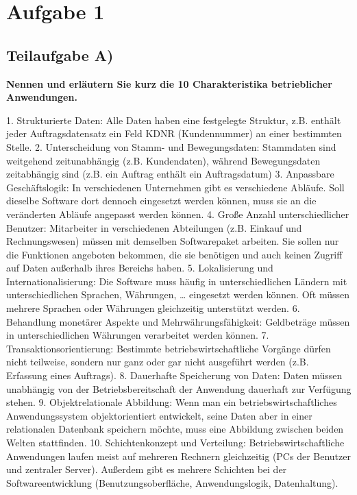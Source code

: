 \section{Aufgabe 1}

\subsection{Teilaufgabe A)}
\textbf{Nennen und erläutern Sie kurz die 10 Charakteristika betrieblicher
Anwendungen.}

1. Strukturierte Daten: Alle Daten haben eine festgelegte Struktur, z.B. enthält jeder
Auftragsdatensatz ein Feld KDNR (Kundennummer) an einer bestimmten Stelle.
2. Unterscheidung von Stamm- und Bewegungsdaten: Stammdaten sind weitgehend
zeitunabhängig (z.B. Kundendaten), während Bewegungsdaten zeitabhängig sind (z.B. ein
Auftrag enthält ein Auftragsdatum)
3. Anpassbare Geschäftslogik: In verschiedenen Unternehmen gibt es verschiedene Abläufe.
Soll dieselbe Software dort dennoch eingesetzt werden können, muss sie an die veränderten
Abläufe angepasst werden können.
4. Große Anzahl unterschiedlicher Benutzer: Mitarbeiter in verschiedenen Abteilungen (z.B.
Einkauf und Rechnungswesen) müssen mit demselben Softwarepaket arbeiten. Sie sollen
nur die Funktionen angeboten bekommen, die sie benötigen und auch keinen Zugriff auf
Daten außerhalb ihres Bereichs haben.
5. Lokalisierung und Internationalisierung: Die Software muss häufig in unterschiedlichen
Ländern mit unterschiedlichen Sprachen, Währungen, … eingesetzt werden können. Oft
müssen mehrere Sprachen oder Währungen gleichzeitig unterstützt werden.
6. Behandlung monetärer Aspekte und Mehrwährungsfähigkeit: Geldbeträge müssen in
unterschiedlichen Währungen verarbeitet werden können.
7. Transaktionsorientierung: Bestimmte betriebswirtschaftliche Vorgänge dürfen nicht
teilweise, sondern nur ganz oder gar nicht ausgeführt werden (z.B. Erfassung eines
Auftrags).
8. Dauerhafte Speicherung von Daten: Daten müssen unabhängig von der
Betriebsbereitschaft der Anwendung dauerhaft zur Verfügung stehen.
9. Objektrelationale Abbildung: Wenn man ein betriebswirtschaftliches Anwendungssystem
objektorientiert entwickelt, seine Daten aber in einer relationalen Datenbank speichern
möchte, muss eine Abbildung zwischen beiden Welten stattfinden.
10. Schichtenkonzept und Verteilung: Betriebswirtschaftliche Anwendungen laufen meist auf
mehreren Rechnern gleichzeitig (PCs der Benutzer und zentraler Server). Außerdem gibt es
mehrere Schichten bei der Softwareentwicklung (Benutzungsoberfläche, Anwendungslogik,
Datenhaltung).

